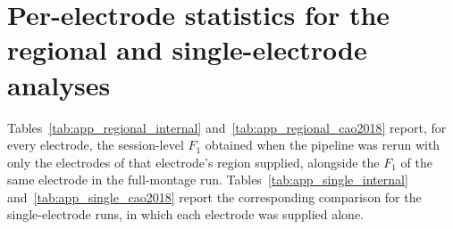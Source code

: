 \documentclass[journal,twoside,web]{ieeecolor}
\begin{document}
%

%
\makeatletter
{}
\makeatother



%
%
\clearpage
\makeatletter
{}
\makeatother
\appendices
%
%
%
\section{Per-electrode statistics for the regional and single-electrode analyses}
\label{app:per_electrode_stats}

Tables~\ref{tab:app_regional_internal} and~\ref{tab:app_regional_cao2018} report, for every electrode, the session-level $F_1$ obtained when the pipeline was rerun with only the electrodes of that electrode's region supplied, alongside the $F_1$ of the same electrode in the full-montage run. Tables~\ref{tab:app_single_internal} and~\ref{tab:app_single_cao2018} report the corresponding comparison for the single-electrode runs, in which each electrode was supplied alone.
\end{document}
